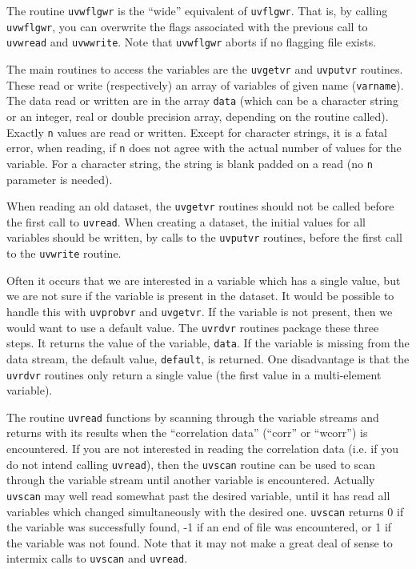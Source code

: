 The routine {\tt uvwflgwr} is the ``wide'' equivalent of {\tt uvflgwr}.
That is, by calling {\tt uvwflgwr}, you can overwrite the flags associated
with the previous call to {\tt uvwread} and {\tt uvwwrite}.  Note that
{\tt uvwflgwr} aborts if no flagging file exists.


The main routines to access the variables are the {\tt uvgetvr} and
{\tt uvputvr} routines. These read or write (respectively) an array of
variables of given name ({\tt varname}). The data read or written are
in the array {\tt data} (which can be a character string or an integer, real
or double precision
array, depending on the routine called). Exactly {\tt n} values are
read or written. Except for character strings, it is a fatal error,
when reading, if {\tt n} does not
agree with the actual number of values for the variable. For a character
string, the string is blank padded on a read (no {\tt n} parameter is
needed).

When reading an old dataset, the {\tt uvgetvr} routines should not be called
before the first call to {\tt uvread}.
When creating a dataset, the initial values for all variables should be
written, by calls to the {\tt uvputvr} routines, before the first call
to the {\tt uvwrite} routine.

Often it occurs that we are interested in a variable which has a single
value, but we are not sure if the variable is present in the dataset.
It would be possible to handle this with {\tt uvprobvr} and {\tt uvgetvr}.
If the variable is not present, then we would want to use a default value.
The {\tt uvrdvr} routines package these three steps. It returns the
value of the variable, {\tt data}. If the variable is missing from the
data stream, the default value, {\tt default}, is returned. One disadvantage
is that the {\tt uvrdvr} routines only return a single value (the first
value in a multi-element variable).

The routine {\tt uvread} functions by scanning through the variable streams
and returns with its results when the ``correlation data'' (``corr'' or
``wcorr'') is encountered. If you are not interested in reading the
correlation data (i.e. if you do not intend calling {\tt uvread}),
then the {\tt uvscan} routine can be used to scan through the variable stream
until another variable is encountered. Actually {\tt uvscan} may well read
somewhat past the desired variable, until it has read
all variables which changed simultaneously with the desired one.
{\tt uvscan} returns 0 if the variable was successfully found, -1 if an end
of file was encountered, or 1 if the variable was not found. Note that it
may not make a great deal of sense to intermix calls to {\tt uvscan}
and {\tt uvread}.

